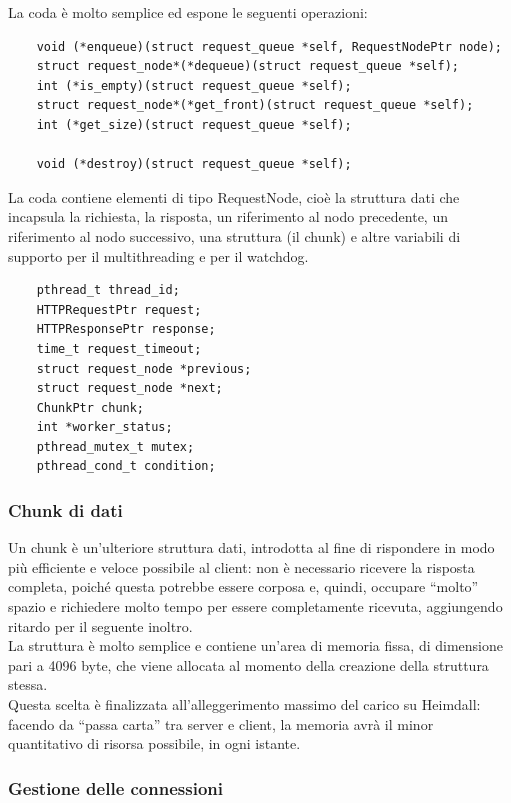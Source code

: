 \documentclass[italian]{tktltiki2}
\begin{document}
La coda è molto semplice ed espone le seguenti operazioni:
\begin{lstlisting}
    void (*enqueue)(struct request_queue *self, RequestNodePtr node);
    struct request_node*(*dequeue)(struct request_queue *self);
    int (*is_empty)(struct request_queue *self);
    struct request_node*(*get_front)(struct request_queue *self);
    int (*get_size)(struct request_queue *self);

    void (*destroy)(struct request_queue *self);
\end{lstlisting}

La coda contiene elementi di tipo RequestNode, cioè la struttura dati che incapsula la richiesta, la risposta, un riferimento al nodo precedente, un riferimento al nodo successivo, una struttura (il chunk) e altre variabili di supporto per il multithreading e per il watchdog.

\begin{lstlisting}
    pthread_t thread_id;
    HTTPRequestPtr request;
    HTTPResponsePtr response;
    time_t request_timeout;
    struct request_node *previous;
    struct request_node *next;
    ChunkPtr chunk;
    int *worker_status;
    pthread_mutex_t mutex;
    pthread_cond_t condition;
\end{lstlisting}

\subsubsection*{Chunk di dati}
\label{sec:chunk}
Un chunk è un'ulteriore struttura dati, introdotta al fine di rispondere in modo più efficiente e veloce possibile al client: non è necessario ricevere la risposta completa, poiché questa potrebbe essere corposa e, quindi, occupare ``molto'' spazio e richiedere molto tempo per essere completamente ricevuta, aggiungendo ritardo per il seguente inoltro.
\\
La struttura è molto semplice e contiene un'area di memoria fissa, di dimensione pari a 4096 byte, che viene allocata al momento della creazione della struttura stessa.
\\
Questa scelta è finalizzata all'alleggerimento massimo del carico su Heimdall: facendo da ``passa carta'' tra server e client, la memoria avrà il minor quantitativo di risorsa possibile, in ogni istante. 

\subsubsection{Gestione delle connessioni}
\end{document}
